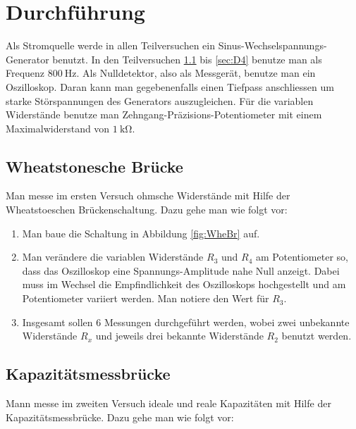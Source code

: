 \newpage

 \section{Durchführung}
\label{sec:Durchführung}

Als Stromquelle werde in allen Teilversuchen ein
Sinus-Wechselspannungs-Generator benutzt. In den Teilversuchen \ref{sec:D1}
bis \ref{sec:D4} benutze man als Frequenz $\SI{800}{\Hz}$.
Als Nulldetektor, also als Messgerät, benutze man ein Oszilloskop. Daran
kann man gegebenenfalls einen Tiefpass anschliessen um starke Störspannungen
des Generators auszugleichen.
Für die variablen Widerstände benutze man Zehngang-Präzisions-Potentiometer
mit einem Maximalwiderstand von $\SI{1}{\kilo\ohm}$.


\subsection{Wheatstonesche Brücke}
\label{sec:D1}

Man messe im ersten Versuch ohmsche Widerstände mit Hilfe der Wheatstoeschen
Brückenschaltung. Dazu gehe man wie folgt vor:

\begin{enumerate}

\item Man baue die Schaltung in Abbildung \ref{fig:WheBr} auf.

\item Man verändere die variablen Widerstände $R_3$ und $R_4$ am Potentiometer
so, dass das Oszilloskop eine Spannungs-Amplitude nahe Null anzeigt.
Dabei muss im Wechsel die Empfindlichkeit des Oszilloskops hochgestellt
und am Potentiometer variiert werden. Man notiere den Wert für $R_3$.

\item Insgesamt sollen 6 Messungen durchgeführt werden, wobei zwei unbekannte
Widerstände $R_x$ und jeweils drei bekannte Widerstände $R_2$ benutzt werden.

\end{enumerate}


\subsection{Kapazitätsmessbrücke}

Mann messe im zweiten Versuch ideale und reale Kapazitäten mit Hilfe
der Kapazitätsmessbrücke. Dazu gehe man wie folgt vor:


